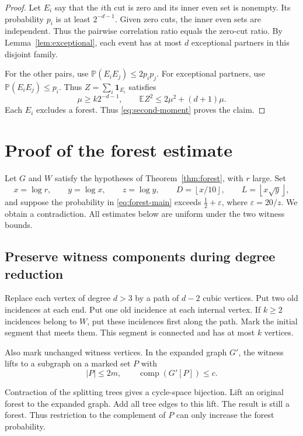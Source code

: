 \documentclass[11pt,a4paper]{article}
\numberwithin{equation}{section}
\theoremstyle{definition}
\theoremstyle{remark}
\newcommand{\E}{\mathbb E}
\newcommand{\Prob}{\mathbb P}
\newcommand{\cc}{\operatorname{comp}}
\newcommand{\eps}{\varepsilon}
\newcommand{\ind}{\mathbf 1}
\newcommand{\floor}[1]{\left\lfloor#1\right\rfloor}
\begin{document}
\begin{proof}
Let $E_i$ say that the $i$th cut is zero and its inner even set is nonempty. Its probability $p_i$ is at least $2^{-d-1}$. Given zero cuts, the inner even sets are independent. Thus the pairwise correlation ratio equals the zero-cut ratio. By Lemma~\ref{lem:exceptional}, each event has at most $d$ exceptional partners in this disjoint family.

For the other pairs, use $\Prob(E_iE_j)\le2p_ip_j$. For exceptional partners, use $\Prob(E_iE_j)\le p_i$. Thus $Z=\sum_i\ind_{E_i}$ satisfies
\[
 \mu\ge k2^{-d-1},\qquad\E Z^2\le2\mu^2+(d+1)\mu.
\]
Each $E_i$ excludes a forest. Thus \eqref{eq:second-moment} proves the claim.
\end{proof}

\section{Proof of the forest estimate}\label{sec:forest}
Let $G$ and $W$ satisfy the hypotheses of Theorem~\ref{thm:forest}, with $r$ large. Set
\[
 x=\log r,\qquad y=\log x,\qquad z=\log y,\qquad D=\floor{x/10},\qquad L=\floor{x\sqrt y},
\]
and suppose the probability in \eqref{eq:forest-main} exceeds $\frac12+\eps$, where $\eps=20/z$. We obtain a contradiction. All estimates below are uniform under the two witness bounds.

\subsection{Preserve witness components during degree reduction}\label{sec:cubic}
Replace each vertex of degree $d>3$ by a path of $d-2$ cubic vertices. Put two old incidences at each end. Put one old incidence at each internal vertex. If $k\ge2$ incidences belong to $W$, put these incidences first along the path. Mark the initial segment that meets them. This segment is connected and has at most $k$ vertices.

Also mark unchanged witness vertices. In the expanded graph $G'$, the witness lifts to a subgraph on a marked set $P$ with
\[
 |P|\le2m,\qquad\cc(G'[P])\le c.
\]

Contraction of the splitting trees gives a cycle-space bijection. Lift an original forest to the expanded graph. Add all tree edges to this lift. The result is still a forest. Thus restriction to the complement of $P$ can only increase the forest probability.
\end{document}
